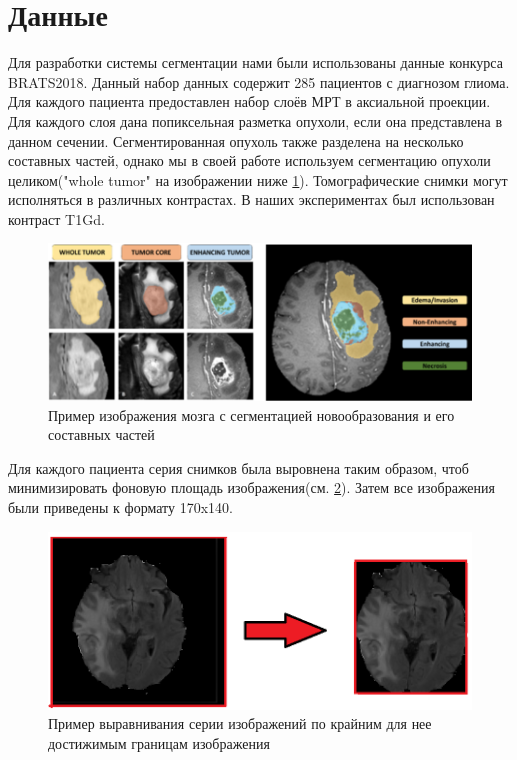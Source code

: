\section{Данные}

Для разработки системы сегментации нами были использованы данные конкурса BRATS2018. Данный набор данных содержит 285 пациентов с диагнозом глиома. Для каждого пациента предоставлен набор слоёв МРТ в аксиальной проекции. Для каждого слоя дана попиксельная разметка опухоли, если она представлена в данном сечении. Сегментированная опухоль также разделена на несколько составных частей, однако мы в своей работе используем сегментацию опухоли целиком("whole tumor" на изображении ниже \ref{fig:bratss}).  Томографические снимки могут исполняться в различных контрастах. В наших экспериментах был использован контраст T1Gd. 

\begin{figure}[ht] 
  \center
  \includegraphics [scale=0.6] {images/brats.png}
  \caption{ Пример изображения мозга с сегментацией новообразования и его составных частей} 
  \label{fig:bratss}  
\end{figure}
Для каждого пациента серия снимков была выровнена таким образом, чтоб минимизировать фоновую площадь изображения(см. \ref{fig:transform}). Затем все изображения были приведены к формату 170x140.

\begin{figure}[ht] 
  \center
  \includegraphics [scale=0.6] {images/transform.png}
  \caption{ Пример выравнивания серии изображений по крайним для нее достижимым границам изображения} 
  \label{fig:transform}  
\end{figure}

